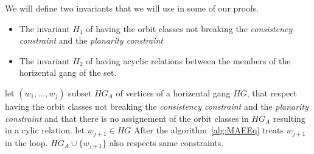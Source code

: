 We will define two invariants that we will use in some of our proofs. 
\begin{itemize}
    \item The invariant $H_1$ of having the orbit classes not breaking the \textit{consistency constraint} 
        and the \textit{planarity constraint}
    \item The invariant $H_2$ of having acyclic relations between 
        the members of the horizental gang of the set. 
\end{itemize}
\begin{lemma}
    \label{lm:newgangmember}
    let $\left( w_1, \ldots, w_j \right)$ subset $HG_{A}$ of vertices of a horizental gang $HG$, that 
    respect  having the orbit classes not breaking the \textit{consistency constraint} 
    and the \textit{planarity constraint}  and  that there is no 
    assignement of the orbit classes in $HG_{A}$ resulting in a cylic relation. 
    let $w_{j+1} \in HG$
    After the algorithm~\ref{alg:MAEEq} treats $w_{j+1}$ in the loop. $HG_{A} \cup \{w_{j+1}\}$ also 
    respects same constraints. 
\end{lemma}
